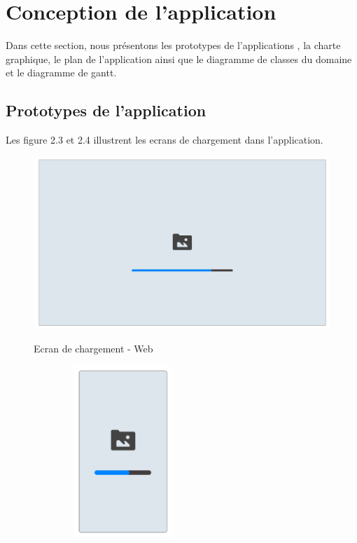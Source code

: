 \section{Conception de l'application}

Dans cette section, nous présentons les prototypes de l'applications , la charte graphique, le plan de l'application ainsi que le diagramme de classes du domaine et le diagramme de gantt.

\subsection{Prototypes de l'application}


Les figure 2.3 et 2.4 illustrent les ecrans de chargement dans l'application.
\newpage
\begin{figure}[h!]
  \centering
  \begin{minipage}[t]{0.60\textwidth}
    \centering
    \includegraphics[width=1\textwidth, height=6.5cm]{chap2.images/splash web.png}
    \caption{Ecran de chargement - Web}
  \end{minipage}
  \hfill
  \begin{minipage}[t]{0.38\textwidth}
    \centering
    \includegraphics[width=0.6\textwidth, height=6.5cm]{chap2.images/splash mob.png}
    \caption{}
  \end{minipage}
\end{figure}


